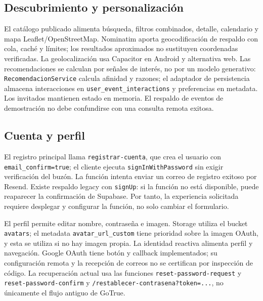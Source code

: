 \subsection{Descubrimiento y personalización}
El catálogo publicado alimenta búsqueda, filtros combinados, detalle, calendario y
mapa Leaflet/OpenStreetMap. Nominatim aporta geocodificación de respaldo con cola,
caché y límites; los resultados aproximados no sustituyen coordenadas verificadas.
La geolocalización usa Capacitor en Android y alternativa web.
Las recomendaciones se calculan por señales de interés, no por un modelo generativo:
\texttt{RecomendacionService} calcula afinidad y razones; el adaptador de persistencia
almacena interacciones en \texttt{user\_event\_interactions} y preferencias en metadata.
Los invitados mantienen estado en memoria. El respaldo de eventos de demostración no
debe confundirse con una consulta remota exitosa.

\subsection{Cuenta y perfil}
El registro principal llama \texttt{registrar-cuenta}, que crea el usuario con
\texttt{email\_confirm=true}; el cliente ejecuta \texttt{signInWithPassword} sin
exigir verificación del buzón. La función intenta enviar un correo de registro exitoso
por Resend. Existe respaldo legacy con \texttt{signUp}: si la función no está disponible,
puede reaparecer la confirmación de Supabase. Por tanto, la experiencia solicitada
requiere desplegar y configurar la función, no solo cambiar el formulario.

El perfil permite editar nombre, contraseña e imagen. Storage utiliza el bucket
\texttt{avatars}; el metadata \texttt{avatar\_url\_custom} tiene prioridad sobre la imagen
OAuth, y esta se utiliza si no hay imagen propia. La identidad reactiva alimenta perfil
y navegación. Google OAuth tiene botón y callback implementados; su configuración remota
y la recepción de correos no se certifican por inspección de código.
La recuperación actual usa las funciones \texttt{reset-password-request} y \texttt{reset-password-confirm} y
\texttt{/restablecer-contrasena?token=...}, no únicamente el flujo antiguo de GoTrue.

